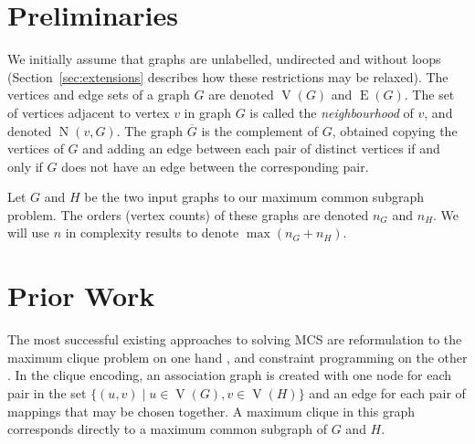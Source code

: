 \documentclass[letterpaper]{article}
\DeclareMathOperator{\V}{V}
\DeclareMathOperator{\E}{E}
\DeclareMathOperator{\N}{N}
\begin{document}
\section{Preliminaries}

We initially assume that graphs are unlabelled, undirected and without loops
(Section~\ref{sec:extensions} describes how these restrictions may be relaxed).
The vertices and edge sets of a graph $G$ are denoted $\V(G)$ and $\E(G)$.  The
set of vertices adjacent to vertex $v$ in graph $G$ is called the
\emph{neighbourhood} of $v$, and denoted $\N(v, G)$.  The graph $\overline{G}$
is the complement of $G$, obtained copying the vertices of $G$ and adding an
edge between each pair of distinct vertices if and only if $G$ does not
have an edge between the corresponding pair.

Let $G$ and $H$ be the two input graphs to our maximum common subgraph problem.
The orders (vertex counts) of these graphs are denoted $n_G$ and $n_H$. We will
use $n$ in complexity results to denote $\max(n_G + n_H)$.

\section{Prior Work}

The most successful existing approaches to solving MCS are reformulation to the
maximum clique problem on one hand \cite{DBLP:conf/cp/McCreeshNPS16}, and
constraint programming on the other \cite{DBLP:conf/cp/NdiayeS11}. In the
clique encoding, an association graph is created with one node for each pair in
the set $\{(u,v) \mid u \in \V(G), v \in \V(H) \}$ and an edge for each pair of
mappings that may be chosen together. A maximum clique in this graph
corresponds directly to a maximum common subgraph of $G$ and $H$.
\end{document}
